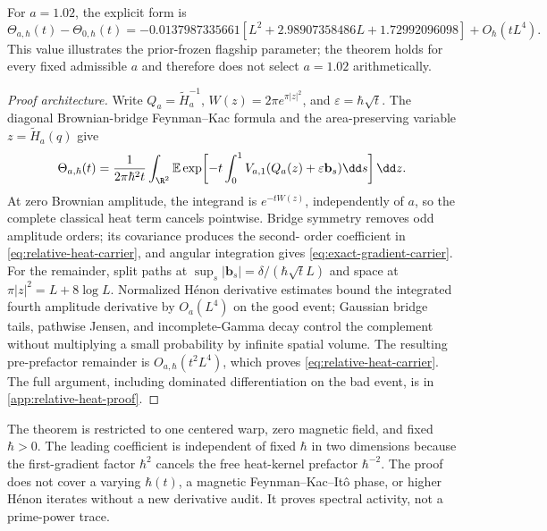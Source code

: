 For \(a=1.02\), the explicit form is
\begin{equation}
 \Theta_{a,\hbar}(t)-\Theta_{0,\hbar}(t)
 =-0.0137987335661
 \left[L^2+2.98907358486L+1.72992096098\right]
 +O_{\hbar}(tL^4).
 \label{eq:a102-relative-heat}
\end{equation}
This value illustrates the prior-frozen flagship parameter; the theorem
holds for every fixed admissible \(a\) and therefore does not select
\(a=1.02\) arithmetically.

\begin{proof}[Proof architecture]
Write \(Q_a=\widetilde H_a^{-1}\),
\(W(z)=2\pi e^{\pi|z|^2}\), and
\(\varepsilon=\hbar\sqrt t\).  The diagonal Brownian-bridge Feynman--Kac
formula \citep{Simon2005FunctionalIntegration,BoldtGueneysu2023} and the
area-preserving variable \(z=\widetilde H_a(q)\) give
\[
 \Theta_{a,\hbar}(t)=\frac1{2\pi\hbar^2t}
 \int_{\R^2}\mathbb E\exp\!\left[-t\int_0^1
 V_{a,1}(Q_a(z)+\varepsilon\mathbf b_s)\dd s\right]\dd z.
\]
At zero Brownian amplitude, the integrand is \(e^{-tW(z)}\), independently
of \(a\), so the complete classical heat term cancels pointwise.  Bridge
symmetry removes odd amplitude orders; its covariance produces the second-
order coefficient in \cref{eq:relative-heat-carrier}, and angular integration
gives \cref{eq:exact-gradient-carrier}.  For the remainder, split paths at
\(\sup_s|\mathbf b_s|=\delta/(\hbar\sqrt tL)\) and space at
\(\pi|z|^2=L+8\log L\).  Normalized H\'enon derivative estimates bound the
integrated fourth amplitude derivative by \(O_a(L^4)\) on the good event;
Gaussian bridge tails, pathwise Jensen, and incomplete-Gamma decay control
the complement without multiplying a small probability by infinite spatial
volume.  The resulting pre-prefactor remainder is \(O_{a,\hbar}(t^2L^4)\),
which proves \cref{eq:relative-heat-carrier}.  The full argument, including
dominated differentiation on the bad event, is in
\cref{app:relative-heat-proof}.
\end{proof}

The theorem is restricted to one centered warp, zero magnetic field, and
fixed \(\hbar>0\).  The leading coefficient is independent of fixed
\(\hbar\) in two dimensions because the first-gradient factor \(\hbar^2\)
cancels the free heat-kernel prefactor \(\hbar^{-2}\).  The proof does not
cover a varying \(\hbar(t)\), a magnetic Feynman--Kac--It\^o phase, or higher
H\'enon iterates without a new derivative audit.  It proves spectral
activity, not a prime-power trace.

